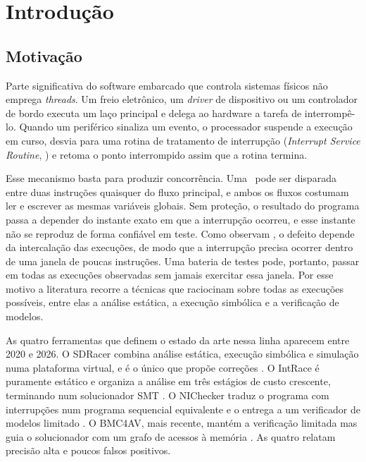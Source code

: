 \chapter{Introdução} \label{cap:introducao}

\section{Motivação}
\label{sec:motivacao}

Parte significativa do software embarcado que controla sistemas físicos não
emprega \textit{threads}. Um freio eletrônico, um \textit{driver} de dispositivo
ou um controlador de bordo executa um laço principal e delega ao hardware a
tarefa de interrompê-lo. Quando um periférico sinaliza um evento, o processador
suspende a execução em curso, desvia para uma rotina de tratamento de
interrupção (\textit{Interrupt Service Routine}, \isr) e retoma o ponto
interrompido assim que a rotina termina.

Esse mecanismo basta para produzir concorrência. Uma \isr\ pode ser disparada
entre duas instruções quaisquer do fluxo principal, e ambos os fluxos costumam
ler e escrever as mesmas variáveis globais. Sem proteção, o resultado do
programa passa a depender do instante exato em que a interrupção ocorreu, e
esse instante não se reproduz de forma confiável em teste. Como observam
, o defeito depende da intercalação das execuções, de modo
que a interrupção precisa ocorrer dentro de uma janela de poucas instruções.
Uma bateria de testes pode, portanto, passar em todas as execuções observadas
sem jamais exercitar essa janela. Por esse motivo a literatura recorre a
técnicas que raciocinam sobre todas as execuções possíveis, entre elas a
análise estática, a execução simbólica e a verificação de modelos.

As quatro ferramentas que definem o estado da arte nessa linha aparecem entre
2020 e 2026. O SDRacer combina análise estática, execução simbólica e simulação
numa plataforma virtual, e é o único que propõe correções \cite{sdracer}. O
IntRace é puramente estático e organiza a análise em três estágios de custo
crescente, terminando num solucionador SMT \cite{intrace}. O NIChecker traduz o
programa com interrupções num programa sequencial equivalente e o entrega a um
verificador de modelos limitado \cite{nichecker}. O BMC4AV, mais recente,
mantém a verificação limitada mas guia o solucionador com um grafo de acessos à
memória \cite{bmc4av}. As quatro relatam precisão alta e poucos falsos
positivos.

